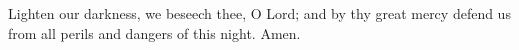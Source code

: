 \documentclass[MAIN]{subfiles}
\begin{document}
Lighten our darkness, we beseech thee, O Lord; and by thy great mercy defend us from all perils and dangers of this night. Amen.
\end{document}
